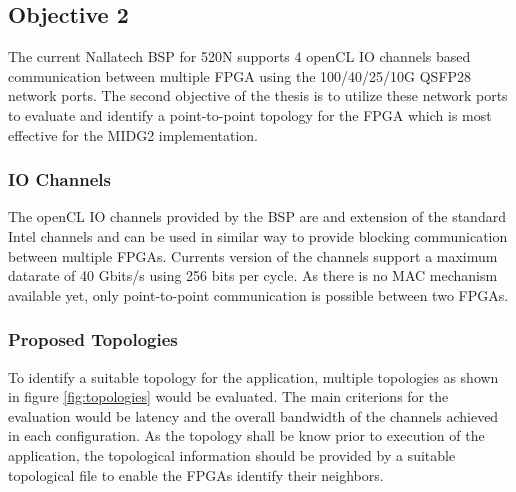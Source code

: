 \documentclass[english,notitlepage]{hgbreport}
\begin{document}
\subsection{Objective 2}

The current Nallatech BSP for 520N supports 4 openCL IO channels based communication between
multiple FPGA using the 100/40/25/10G QSFP28 network ports. The second objective of
the thesis is to utilize these network ports to evaluate and identify a point-to-point
topology for the FPGA which is most effective for the MIDG2 implementation.

\subsubsection{IO Channels}

The openCL IO channels provided by the BSP are and extension of the standard Intel channels \cite{noauthor_intel_2018}
and can be used in similar way to provide blocking communication between multiple FPGAs.
Currents version of the channels support a maximum datarate of 40 Gbits/s using 256 bits per cycle.
As there is no MAC mechanism available yet, only point-to-point communication is possible between
two FPGAs.

\subsubsection{Proposed Topologies}

To identify a suitable topology for the application, multiple topologies
as shown in figure \ref{fig:topologies} would be evaluated. The main criterions for the evaluation
would be latency and the overall bandwidth of the channels achieved in each
configuration. As the topology shall be know prior to execution of the application,
the topological information should be provided by a suitable topological file
to enable the FPGAs identify their neighbors.
\end{document}
